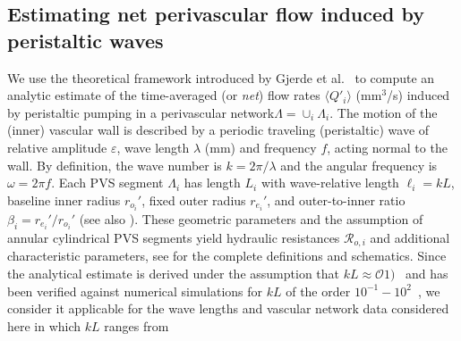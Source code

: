 

\subsection{Estimating net perivascular flow induced by peristaltic waves}
\label{sec:sup:peristalsis}


We use the theoretical framework introduced by Gjerde et al.~\cite{gjerde2023directional} to compute an analytic estimate of the time-averaged (or \emph{net}) flow rates $\langle Q'_i \rangle$ (mm$^3$/s) induced by peristaltic pumping in a perivascular network$\Lambda = \cup_i \Lambda_i$. The motion of the (inner) vascular wall is described by a periodic traveling (peristaltic) wave of relative amplitude $\varepsilon$, wave length $\lambda$ (mm) and frequency $f$, acting normal to the wall. By definition, the wave number is $k = 2 \pi/\lambda$ and the angular frequency is $\omega = 2 \pi f$. Each PVS segment $\Lambda_i$ has length $L_i$ with wave-relative length $\ell_i = k L$, baseline inner radius $r_{o_i}'$, fixed outer radius $r_{e_i}'$, and outer-to-inner ratio $\beta_i = r_{e_i}'/r_{o_i}'$ (see also ). These geometric parameters and the assumption of annular cylindrical PVS segments yield hydraulic resistances $\mathcal{R}_{o, i}$ and additional characteristic parameters, see \cite{gjerde2023directional} for the complete definitions and schematics. Since the analytical estimate is derived under the assumption that $k L \approx \mathcal{O} 1)$~\cite{gjerde2023directional} and has been verified against numerical simulations for $k L$ of the order $10^{-1}-10^2$~\cite[Table I]{gjerde2023directional}, we consider it applicable for the wave lengths and vascular network data considered here in which $k L$ ranges from 

